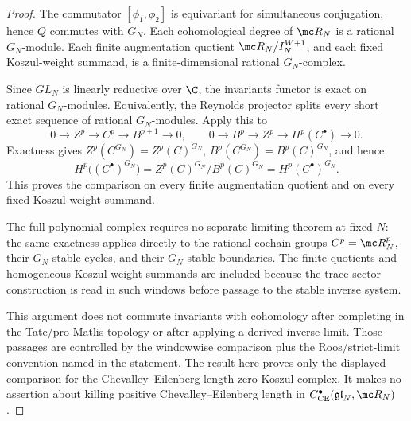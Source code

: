 \documentclass[11pt]{memoir}
\begin{document}
\begin{proof}
  The commutator \([\phi_1,\phi_2]\) is equivariant for simultaneous
  conjugation, hence \(Q\) commutes with \(G_N\).  Each cohomological
  degree of \(\mc R_N\) is a rational \(G_N\)-module.  Each finite
  augmentation quotient \(\mc R_N/I_N^{W+1}\), and each fixed
  Koszul-weight summand, is a finite-dimensional rational
  \(G_N\)-complex.

  Since \(GL_N\) is linearly reductive over \(\C\), the invariants
  functor is exact on rational \(G_N\)-modules.  Equivalently, the
  Reynolds projector splits every short exact sequence of rational
  \(G_N\)-modules.  Apply this to
  \[
    0\longrightarrow Z^p\longrightarrow C^p
      \longrightarrow B^{p+1}\longrightarrow0,
    \qquad
    0\longrightarrow B^p\longrightarrow Z^p
      \longrightarrow H^p(C^\bullet)\longrightarrow0 .
  \]
  Exactness gives
  \(Z^p(C^{G_N})=Z^p(C)^{G_N}\),
  \(B^p(C^{G_N})=B^p(C)^{G_N}\), and hence
  \[
    H^p\bigl((C^\bullet)^{G_N}\bigr)
      =
      Z^p(C)^{G_N}/B^p(C)^{G_N}
      =
      H^p(C^\bullet)^{G_N}.
  \]
  This proves the comparison on every finite augmentation quotient and
  on every fixed Koszul-weight summand.

  The full polynomial complex requires no separate limiting theorem at
  fixed \(N\): the same exactness applies directly to the rational
  cochain groups \(C^p=\mc R_N^p\), their \(G_N\)-stable cycles, and
  their \(G_N\)-stable boundaries.  The finite quotients and homogeneous
  Koszul-weight summands are included because the trace-sector
  construction is read in such windows before passage to the stable
  inverse system.

  This argument does not commute invariants with cohomology after
  completing in the Tate/pro-Matlis topology or after applying a derived
  inverse limit.  Those passages are controlled by the windowwise
  comparison plus the Roos/strict-limit convention named in the
  statement.  The result here proves only the displayed comparison for
  the Chevalley--Eilenberg-length-zero Koszul complex.  It makes no
  assertion about killing positive Chevalley--Eilenberg length in
  \(C^\bullet_{\mathrm{CE}}(\mathfrak{gl}_N,\mc R_N)\).
\end{proof}
\end{document}
